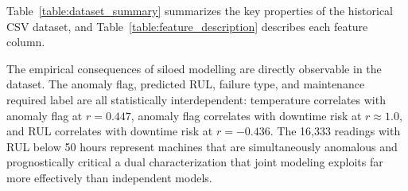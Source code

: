

Table~\ref{table:dataset_summary} summarizes the key properties of the historical CSV dataset, and Table~\ref{table:feature_description} describes each feature column.

The empirical consequences of siloed modelling are directly observable in the dataset. The anomaly flag, predicted RUL, failure type, and maintenance required label are all statistically interdependent: temperature correlates with anomaly flag at $r = 0.447$, anomaly flag correlates with downtime risk at $r \approx 1.0$, and RUL correlates with downtime risk at $r = -0.436$. The 16,333 readings with RUL below 50 hours represent machines that are simultaneously anomalous and prognostically critical a dual characterization that joint modeling exploits far more effectively than independent models.



